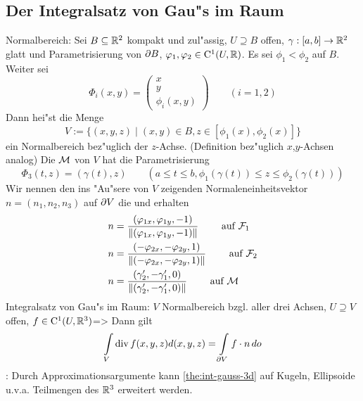 \subsection{Der Integralsatz von Gau"s im Raum}
 Normalbereich:{
  Sei $B\subseteq\SetR^2$ kompakt und zul"assig, $U\supseteq B$ offen,
  $\gamma:[a,b]\to\SetR^2$ glatt und Parametrisierung von $\rim B$,
  $\phi_1,\phi_2\in\SetCont^1(U,\SetR)$. Es sei $\phi_1<\phi_2$ auf $B$.
  Weiter sei
  \[\Phi_i(x,y)=\begin{pmatrix} x \\ y \\ \phi_i(x,y) \end{pmatrix}
    \qquad (i=1,2)
    \]
  Dann hei"st die Menge
  \[V:=\{(x,y,z)\mid (x,y)\in B,z\in[\phi_1(x),\phi_2(x)]\}
    \]
  ein Normalbereich bez"uglich der $z$-Achse. (Definition bez"uglich 
  $x$,$y$-Achsen analog) Die  $\cal M$ von $V$
  hat die Parametrisierung
  \[\Phi_3(t,z)=(\gamma(t),z)\qquad 
    (a\leq t\leq b,\phi_1(\gamma(t))\leq z\leq \phi_2(\gamma(t)))
    \]
  Wir nennen den ins "Au"sere von $V$ zeigenden Normaleneinheitsvektor
  $n=(n_1,n_2,n_3)$ auf $\rim V$ die 
   und erhalten
  \begin{align*}
    n&=\frac{(\phi_{1x},\phi_{1y},-1)}{\norm{(\phi_{1x},\phi_{1y},-1)}} 
        \qquad \text{ auf $\cal F_1$} \\
    n&=\frac{(-\phi_{2x},-\phi_{2y},1)}{\norm{(-\phi_{2x},-\phi_{2y},1)}} 
        \qquad \text{ auf $\cal F_2$} \\
    n&=\frac{(\gamma_2',-\gamma_1',0)}{\norm{(\gamma_2',-\gamma_1',0)}} 
        \qquad \text{ auf $\cal M$}
    \end{align*}
  }
\theorem Integralsatz von Gau"s im Raum:
  $V$ Normalbereich bzgl. aller drei Achsen, $U\supseteq V$ offen,
  $f\in\SetCont^1(U,\SetR^3)$=>{
  \label{the:int-gauss-3d}
  Dann gilt
  \[\int_V \div f(x,y,z)d(x,y,z)=\int_{\rim V} f\cdot n\,do
    \]
  }
\remark:{
  Durch Approximationsargumente kann \ref{the:int-gauss-3d} auf Kugeln,
  Ellipsoide u.v.a. Teilmengen des $\SetR^3$ erweitert werden.
  }
